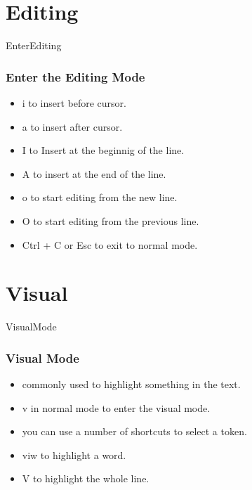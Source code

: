 \documentclass{beamer}
\begin{document}
\section{Editing}
\begin{frame}{EnterEditing}
    \frametitle{Enter the Editing Mode}
    \begin{itemize}
        \item \textsf{i} to \textsf{i}nsert before cursor.
        \item \textsf{a} to insert \textsf{a}fter cursor.
        \item \textsf{I} to \textsf{I}nsert at the beginnig of the line.
        \item \textsf{A} to insert \textsf{a}t the end of the line.
        \item \textsf{o} to start editing from the new line.
        \item \textsf{O} to start editing from the previous line.
        \item \textsf{Ctrl} + \textsf{C} or \textsf{Esc} to exit to normal mode.
    \end{itemize}
\end{frame}

\section{Visual}
\begin{frame}{VisualMode}
    \frametitle{Visual Mode}
    \begin{itemize}
        \item commonly used to highlight something in the text.
        \item \textsf{v} in normal mode to enter the visual mode.
        \item you can use a number of shortcuts to select a token.
        \item \textsf{viw} to highlight a word.
        \item \textsf{V} to highlight the whole line.
    \end{itemize}
\end{frame}
\end{document}
